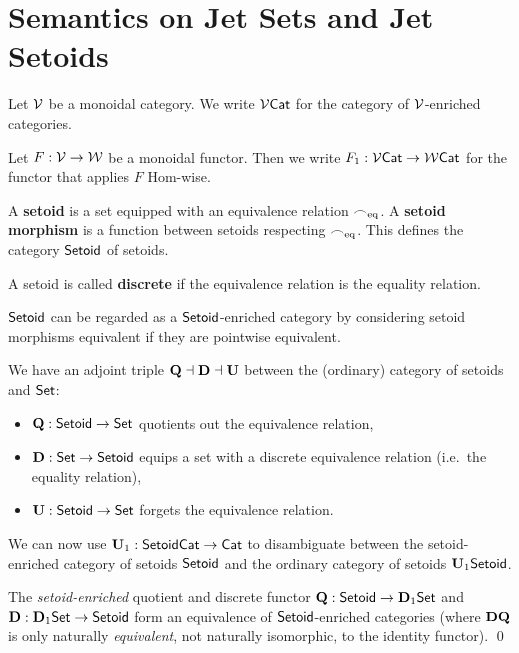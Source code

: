\documentclass[a4paper]{memoir}
\begin{document}
\section{Semantics on Jet Sets and Jet Setoids} \label{sec:poresh-jetset}
\begin{notation} \label{not:enriched}
	Let ${\mathcal{V}}$ be a monoidal category.
	We write ${\mathcal{V}} {\mathsf{Cat}}$ for the category of ${\mathcal{V}}$-enriched categories.
	
	Let $F : {\mathcal{V}} \to {\mathcal{W}}$ be a monoidal functor. Then we write $F_1 : {\mathcal{V}} {\mathsf{Cat}} \to {\mathcal{W}} {\mathsf{Cat}}$ for the functor that applies $F$ Hom-wise.
\end{notation}
\begin{definition} \label{def:setoid}
	A \textbf{setoid} is a set equipped with an equivalence relation ${\frown}_{{\mathrm{eq}}}$.
	A \textbf{setoid morphism} is a function between setoids respecting ${\frown}_{{\mathrm{eq}}}$.
	This defines the category ${\mathsf{Setoid}}$ of setoids.
	
	A setoid is called \textbf{discrete} if the equivalence relation is the equality relation.
	
	${\mathsf{Setoid}}$ can be regarded as a ${\mathsf{Setoid}}$-enriched category by considering setoid morphisms equivalent if they are pointwise equivalent.
\end{definition}
\begin{definition} \label{def:setoid-cohesion}
	We have an adjoint triple ${\mathbf{Q}} \dashv {\mathbf{D}} \dashv {\mathbf{U}}$ between the (ordinary) category of setoids and ${\mathsf{Set}}$:
	\begin{itemize}
		\item ${\mathbf{Q}} : {\mathsf{Setoid}} \to {\mathsf{Set}}$ quotients out the equivalence relation,
		\item ${\mathbf{D}} : {\mathsf{Set}} \to {\mathsf{Setoid}}$ equips a set with a discrete equivalence relation (i.e.\ the equality relation),
		\item ${\mathbf{U}} : {\mathsf{Setoid}} \to {\mathsf{Set}}$ forgets the equivalence relation.
	\end{itemize}
\end{definition}
We can now use ${\mathbf{U}}_1 : {\mathsf{Setoid}}{\mathsf{Cat}} \to {\mathsf{Cat}}$ to disambiguate between the setoid-enriched category of setoids ${\mathsf{Setoid}}$ and the ordinary category of setoids ${\mathbf{U}}_1 {\mathsf{Setoid}}$.
\begin{corollary} \label{thm:setoid-equiv-set}
	The \emph{setoid-enriched} quotient and discrete functor ${\mathbf{Q}} : {\mathsf{Setoid}} \to {\mathbf{D}}_1 {\mathsf{Set}}$ and ${\mathbf{D}} : {\mathbf{D}}_1 {\mathsf{Set}} \to {\mathsf{Setoid}}$ form an equivalence of ${\mathsf{Setoid}}$-enriched categories (where ${\mathbf{D}} {\mathbf{Q}}$ is only naturally \emph{equivalent}, not naturally isomorphic, to the identity functor). \qed
\end{corollary}
\end{document}
